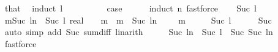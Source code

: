 \begin{isabellebody}
\isamarkupfalse%
\ that\ \isamarkupfalse%
\ {\isacharparenleft}{\kern0pt}induct\ l{\isacharparenright}{\kern0pt}\isanewline
\ \ \isamarkupfalse%
\ {}\isanewline
\ \ \isamarkupfalse%
\ \isamarkupfalse%
\ {\isacharquery}{\kern0pt}case\isanewline
\ \ \ \ \isamarkupfalse%
\ {\isacharparenleft}{\kern0pt}induct\ n{\isacharsemicolon}{\kern0pt}\ fastforce{\isacharparenright}{\kern0pt}\isanewline
{}\isamarkupfalse%
\isanewline
\ \ \isamarkupfalse%
\ {\isacharparenleft}{\kern0pt}Suc\ l{\isacharparenright}{\kern0pt}\isanewline
\ \ \isamarkupfalse%
\ {\isachardoublequoteopen}{\isacharparenleft}{\kern0pt}{\isasymSum}m{\isasymin}{\isacharbraceleft}{\kern0pt}Suc\ l{\isachardot}{\kern0pt}{\isachardot}{\kern0pt}n{\isacharbraceright}{\kern0pt}\ {\isacharminus}{\kern0pt}\ {\isacharbraceleft}{\kern0pt}Suc\ l{\isacharbraceright}{\kern0pt}{\isachardot}{\kern0pt}\ {\isacharparenleft}{\kern0pt}{}{\isacharcolon}{\kern0pt}{\isacharcolon}{\kern0pt}real{\isacharparenright}{\kern0pt}\ {\isacharslash}{\kern0pt}\ {}\ {\isacharcircum}{\kern0pt}\ m{\isacharparenright}{\kern0pt}\ {\isacharequal}{\kern0pt}\ {\isacharparenleft}{\kern0pt}{\isasymSum}m\ {\isacharequal}{\kern0pt}\ Suc\ l{\isachardot}{\kern0pt}{\isachardot}{\kern0pt}n{\isachardot}{\kern0pt}\ {}\ {\isacharslash}{\kern0pt}\ {}\ {\isacharcircum}{\kern0pt}\ m{\isacharparenright}{\kern0pt}\ {\isacharminus}{\kern0pt}\ {}\ {\isacharslash}{\kern0pt}\ {}\ {\isacharcircum}{\kern0pt}\ Suc\ l{\isachardoublequoteclose}\isanewline
\ \ \ \ \isamarkupfalse%
\ Suc\ \isamarkupfalse%
\ {\isacharparenleft}{\kern0pt}auto\ simp\ add{\isacharcolon}{\kern0pt}\ Suc\ sum{\isacharunderscore}{\kern0pt}diff{}{\isacharcomma}{\kern0pt}\ linarith{\isacharparenright}{\kern0pt}\isanewline
\ \ \isamarkupfalse%
\ \isamarkupfalse%
\ {\isachardoublequoteopen}{\isacharbraceleft}{\kern0pt}Suc\ l{\isachardot}{\kern0pt}{\isachardot}{\kern0pt}n{\isacharbraceright}{\kern0pt}\ {\isacharminus}{\kern0pt}\ {\isacharbraceleft}{\kern0pt}Suc\ l{\isacharbraceright}{\kern0pt}\ {\isacharequal}{\kern0pt}\ {\isacharbraceleft}{\kern0pt}Suc\ {\isacharparenleft}{\kern0pt}Suc\ l{\isacharparenright}{\kern0pt}{\isachardot}{\kern0pt}{\isachardot}{\kern0pt}n{\isacharbraceright}{\kern0pt}{\isachardoublequoteclose}\ \isanewline
\ \ \ \ \isamarkupfalse%
\ fastforce\isanewline

\end{isabellebody}

